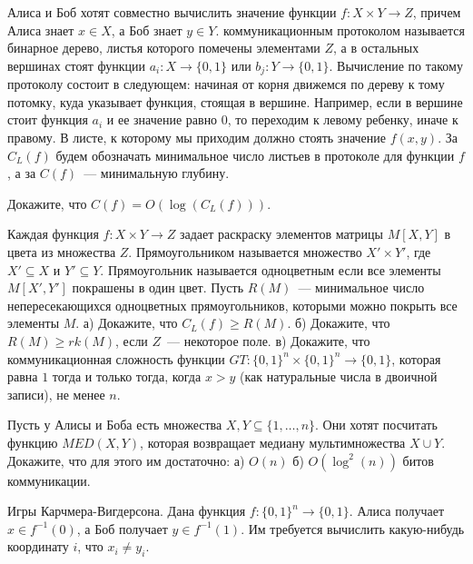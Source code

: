 \setcounter{curtask}{15}



Алиса и Боб хотят совместно вычислить значение функции $f: X \times Y \rightarrow Z$, причем Алиса знает $x \in X$, а Боб знает $y
\in Y$. коммуникационным протоколом называется бинарное дерево, листья которого помечены элементами $Z$, а в остальных вершинах
стоят функции $a_i: X \rightarrow \{0, 1\}$ или $b_j: Y \rightarrow \{0, 1\}$. Вычисление по такому протоколу состоит в следующем:
начиная от корня движемся по дереву к тому потомку, куда указывает функция, стоящая в вершине. Например, если в вершине стоит
функция $a_i$ и ее значение равно $0$, то переходим к левому ребенку, иначе к правому. В листе, к которому мы приходим должно
стоять значение $f(x, y)$. За $C_L(f)$ будем обозначать минимальное число листьев в протоколе для функции $f$, а за $C(f)$~---
минимальную глубину.


\begin{task}
    Докажите, что $C(f) = O(\log(C_L(f)))$.
\end{task}

\begin{task}
    Каждая функция $f: X \times Y \rightarrow Z$ задает раскраску элементов матрицы $M[X, Y]$ в цвета из множества
    $Z$. Прямоугольником называется множество $X' \times Y'$, где $X' \subseteq X$ и $Y' \subseteq Y$. Прямоугольник называется
    одноцветным если все элементы $M[X', Y']$ покрашены в один цвет. Пусть $R(M)$~--- минимальное число непересекающихся одноцветных
    прямоугольников, которыми можно покрыть все элементы $M$.
    а) Докажите, что $C_L(f) \ge R(M)$. б) Докажите, что $R(M) \ge rk(M)$, если $Z$~--- некоторое поле.
    в) Докажите, что коммуникационная сложность функции $GT: \{0, 1\}^n \times \{0, 1\}^n \rightarrow \{0, 1\}$, которая равна $1$
    тогда и только тогда, когда $x > y$ (как натуральные числа в двоичной записи), не менее $n$.
\end{task}

\begin{task}
    Пусть у Алисы и Боба есть множества $X, Y \subseteq \{1, \dots, n\}$. Они хотят посчитать функцию $MED(X, Y)$, которая
    возвращает медиану мультимножества $X \cup Y$. Докажите, что для этого им достаточно: а) $O(n)$ б) $O(\log^2(n))$ битов коммуникации.
\end{task}



Игры Карчмера-Вигдерсона. Дана функция $f: \{0, 1\}^n \rightarrow \{0, 1\}$. Алиса получает $x \in f^{-1}(0)$, а Боб получает $y
\in f^{-1}(1)$. Им требуется вычислить какую-нибудь координату $i$, что $x_i \neq y_i$.

